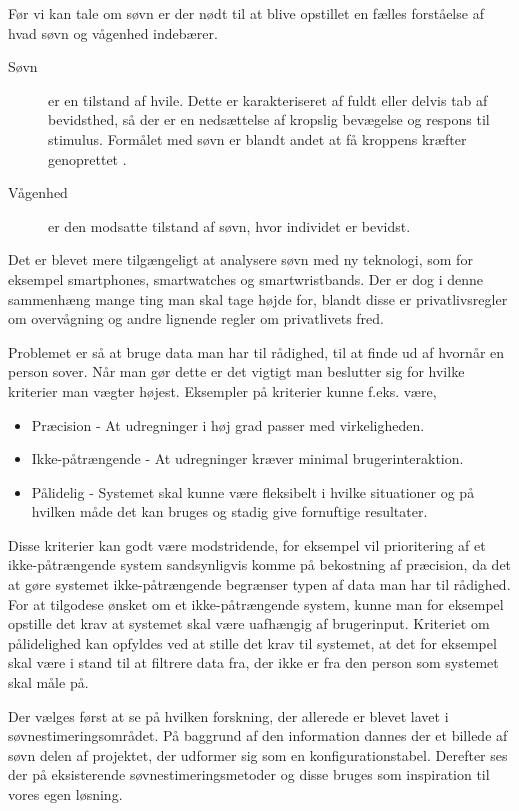 Før vi kan tale om søvn er der nødt til at blive opstillet en fælles forståelse af hvad søvn og vågenhed indebærer.
\begin{description}
		\item[Søvn] er en tilstand af hvile. Dette er karakteriseret af fuldt eller delvis tab af bevidsthed, så der er en nedsættelse af kropslig bevægelse og respons til stimulus. Formålet med søvn er blandt andet at få kroppens kræfter genoprettet \citep{misc:SleepDefinition}.
		\item[Vågenhed] er den modsatte tilstand af søvn, hvor individet er bevidst.
\end{description}

Det er blevet mere tilgængeligt at analysere søvn med ny teknologi, som for eksempel smartphones, smartwatches og smartwristbands.
Der er dog i denne sammenhæng mange ting man skal tage højde for, blandt disse er privatlivsregler om overvågning og andre lignende regler om privatlivets fred.

Problemet er så at bruge data man har til rådighed, til at finde ud af hvornår en person sover.
Når man gør dette er det vigtigt man beslutter sig for hvilke kriterier man vægter højest.
Eksempler på kriterier kunne f.eks. være,

\begin{itemize}
	\item Præcision - At udregninger i høj grad passer med virkeligheden.
	\item Ikke-påtrængende - At udregninger kræver minimal brugerinteraktion.
	\item Pålidelig - Systemet skal kunne være fleksibelt i hvilke situationer og på hvilken måde det kan bruges og stadig give fornuftige resultater.
\end{itemize}

Disse kriterier kan godt være modstridende, for eksempel vil prioritering af et ikke-påtrængende system sandsynligvis komme på bekostning af præcision, da det at gøre systemet ikke-påtrængende begrænser typen af data man har til rådighed.
For at tilgodese ønsket om et ikke-påtrængende system, kunne man for eksempel opstille det krav at systemet skal være uafhængig af brugerinput.
Kriteriet om pålidelighed kan opfyldes ved at stille det krav til systemet, at det for eksempel skal være i stand til at filtrere data fra, der ikke er fra den person som systemet skal måle på.

Der vælges først at se på hvilken forskning, der allerede er blevet lavet i søvn\-es\-ti\-me\-rings\-om\-rå\-det.
På baggrund af den information dannes der et billede af søvn delen af projektet, der udformer sig som en konfigurationstabel.
Derefter ses der på eksisterende søvnestimeringsmetoder og disse bruges som inspiration til vores egen løsning.